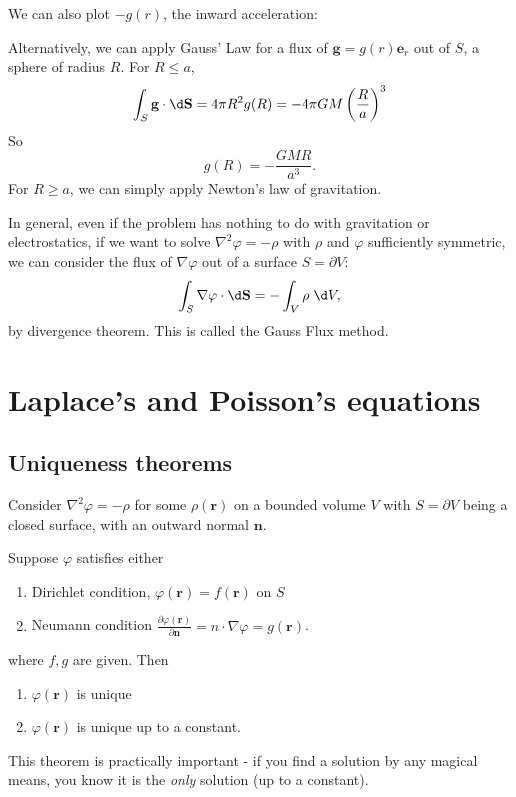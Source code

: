 \documentclass[a4paper]{article}
\begin{document}
\begin{eg}
  We can also plot $-g(r)$, the inward acceleration:
  \begin{center}
  \end{center}

  Alternatively, we can apply Gauss' Law for a flux of $\mathbf{g} = g(r) \mathbf{e}_r$ out of $S$, a sphere of radius $R$. For $R \leq a$,
  \[
    \int_S \mathbf{g}\cdot \d \mathbf{S} = 4\pi R^2 g(R) = -4\pi GM\left(\frac{R}{a}\right)^3
  \]
  So
  \[
    g(R) = -\frac{GMR}{a^3}.
  \]
  For $R \geq a$, we can simply apply Newton's law of gravitation.

  In general, even if the problem has nothing to do with gravitation or electrostatics, if we want to solve $\nabla^2 \varphi = -\rho$ with $\rho$ and $\varphi$ sufficiently symmetric, we can consider the flux of $\nabla \varphi$ out of a surface $S = \partial V$:
  \[
    \int_S \nabla \varphi \cdot \d \mathbf{S} = -\int_V \rho \;\d V,
  \]
  by divergence theorem. This is called the Gauss Flux method.
\end{eg}

\section{Laplace's and Poisson's equations}
\subsection{Uniqueness theorems}
\begin{thm}
  Consider $\nabla^2 \varphi = - \rho$ for some $\rho (\mathbf{r})$ on a bounded volume $V$ with $S = \partial V$ being a closed surface, with an outward normal $\mathbf{n}$.

  Suppose $\varphi$ satisfies either
  \begin{enumerate}
    \item Dirichlet condition, $\varphi(\mathbf{r}) = f(\mathbf{r})$ on $S$
    \item Neumann condition $\frac{\partial \varphi(\mathbf{r})}{\partial \mathbf{n}} = n\cdot \nabla \varphi = g(\mathbf{r})$.
  \end{enumerate}
  where $f, g$ are given. Then
  \begin{enumerate}
    \item $\varphi(\mathbf{r})$ is unique
    \item $\varphi(\mathbf{r})$ is unique up to a constant.
  \end{enumerate}
\end{thm}
This theorem is practically important - if you find a solution by any magical means, you know it is the \emph{only} solution (up to a constant).
\end{document}
